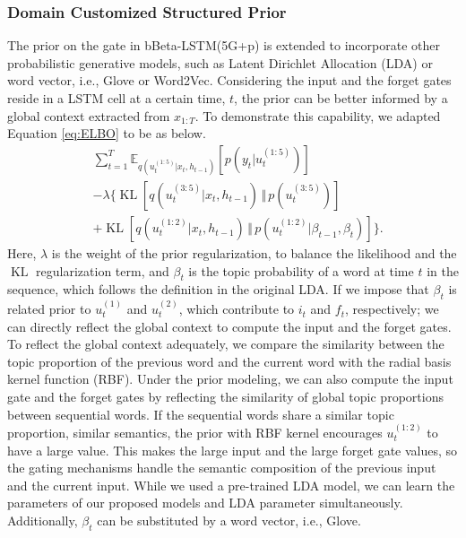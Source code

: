 \documentclass[letterpaper]{article} %
\DeclareMathOperator*{\KL}{KL}
\newcommand{\E}{\mathbb{E}}
\begin{document}
\subsubsection{Domain Customized Structured Prior}
The prior on the gate in bBeta-LSTM(5G+p) is extended to incorporate other probabilistic generative models, such as Latent Dirichlet Allocation (LDA) \cite{blei2003latent} or word vector, i.e., Glove or Word2Vec. Considering the input and the forget gates reside in a LSTM cell at a certain time, $t$, the prior can be better informed by a global context extracted from $x_{1:T}$. To demonstrate this capability, we adapted Equation \ref{eq:ELBO} to be as below.
\begin{align}
&\sum_{t=1}^{T}\E_{q(u_{t}^{(1:5)}|x_{t},h_{t-1})}[p(y_{t}|u_{t}^{(1:5)})] \nonumber \\
&- \lambda\{\KL[q(u_{t}^{(3:5)}|x_{t},h_{t-1}) \, \Vert \, p(u_{t}^{(3:5)})] \nonumber \\
&+\KL[q(u_{t}^{(1:2)}|x_{t},h_{t-1}) \, \Vert \, p(u_{t}^{(1:2)}|\beta_{t-1},\beta_{t})]\}.
\end{align}
Here, $\lambda$ is the weight of the prior regularization, to balance the likelihood and the $\KL$ regularization term, and $\beta_{t}$ is the topic probability of a word at time $t$ in the sequence, which follows the definition in the original LDA. If we impose that $\beta_{t}$ is related prior to $u_{t}^{(1)}$ and $u_{t}^{(2)}$, which contribute to $i_t$ and $f_t$, respectively; we can directly reflect the global context to compute the input and the forget gates.
To reflect the global context adequately, we compare the similarity between the topic proportion of the previous word and the current word with the radial basis kernel function (RBF).
Under the prior modeling, we can also compute the input gate and the forget gates by reflecting the similarity of global topic proportions between sequential words. If the sequential words share a similar topic proportion, similar semantics, the prior with RBF kernel encourages $u_{t}^{(1:2)}$ to have a large value. This makes the large input and the large forget gate values, so the gating mechanisms handle the semantic composition of the previous input and the current input.
While we used a pre-trained LDA model, we can learn the parameters of our proposed models and LDA parameter simultaneously. Additionally, $\beta_{t}$ can be substituted by a word vector, i.e., Glove.
\end{document}
